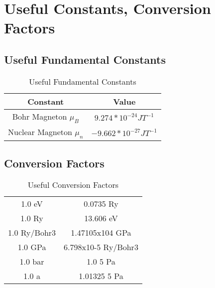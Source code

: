 \chapter{Useful Constants, Conversion Factors}

\section{Useful Fundamental Constants}


\begin{table}[h]
\caption{Useful Fundamental Constants}
\begin{center}
\begin{tabular}{c c}
\hline
Constant & Value \\
\hline
Bohr Magneton $\mu_{B}$ & $9.274 * 10^{-24} J T^{-1}$ \\
Nuclear Magneton $\mu_{n}$ & $-9.662 * 10^{-27} J T^{-1}$ \\
\end{tabular}
\end{center}
\end{table}



\section{Conversion Factors}

\begin{table}[h]
\caption{Useful Conversion Factors}
\begin{center}
\begin{tabular}{c c}
\hline\hline
 1.0 eV & 0.0735 Ry \\ 
 1.0 Ry & 13.606 eV \\
 1.0 Ry/Bohr3 & 1.47105x104 GPa \\
 1.0 GPa & 6.798x10-5 Ry/Bohr3 \\ 
 1.0 bar & 1.0 5 Pa \\
 1.0 a & 1.01325 5 Pa \\
\end{tabular}
\end{center}
\end{table}